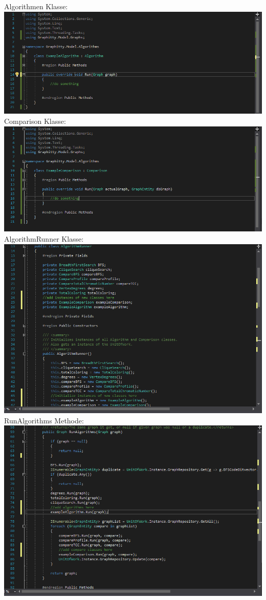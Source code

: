 \documentclass[13pt]{scrreprt}
\begin{document}
Algorithmen Klasse:\\
\includegraphics[scale=0.7,center]{algorithm.PNG}
\newpage
Comparison Klasse:\\
\includegraphics[scale=0.7,center]{comparison.PNG}
AlgorithmRunner Klasse:\\
\includegraphics[scale=0.7,center]{algorithmrunner.PNG}
\newpage
RunAlgorithms Methode:\\
\includegraphics[scale=0.7,center]{runAlgorithms.PNG}
\newpage
\end{document}
